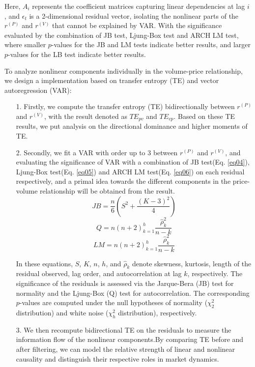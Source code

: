 \documentclass{elsarticle}
\def\sum{}%
\def\rightarrow{}%
\begin{document}
  Here, $A_i$ represents the coefficient matrices capturing linear dependencies at lag $i$ , and $\epsilon_t$ is a 2-dimensional residual vector, isolating the nonlinear parts of the $r^{(P)}$ and $r^{(V)}$ that cannot be explained by VAR. With the significance evaluated by the combination of JB test, Ljung-Box test and ARCH LM test, where smaller $p$-values for the JB and LM tests indicate better results, and larger $p$-values for the LB test indicate better results.
  
  To analyze nonlinear components individually in the volume-price relationship, we design a implementation based on transfer entropy (TE) and vector autoregression (VAR):
\begin{itemize}
  \item[1.] Firstly, we compute the transfer entropy (TE) bidirectionally between $r^{(P)}$ and $r^{(V)}$, with the result denoted as $TE_{p\rightarrow v}$ and $TE_{v\rightarrow p}$. Based on these TE results, we put analysis on the directional dominance and higher moments of TE.
  \item[2.] Secondly, we fit a VAR with order up to 3 between $r^{(P)}$ and $r^{(V)}$, and evaluating the significance of VAR with a combination of JB test(Eq. \ref{eq04}), Ljung-Box test(Eq. \ref{eq05}) and ARCH LM test(Eq. \ref{eq06}) on each residual respectively, and a primal idea towards the different components in the price-volume relationship will be obtained from the result.
  \begin{equation} \label{eq04}
    JB = \frac{n}{6} \left( S^2 + \frac{(K - 3)^2}{4} \right)
  \end{equation}
  \begin{equation} \label{eq05}
    Q = n(n+2) \sum_{k=1}^{h} \frac{\hat{\rho}_k^2}{n - k}
  \end{equation}
  \begin{equation} \label{eq06}
    LM = n(n+2) \sum_{k=1}^{h} \frac{\hat{\rho}_k^2}{n - k}
  \end{equation}

  In these equations, $S$, $K$, $n$, $h$, and \(\hat{\rho}_k\) denote skewness, kurtosis, length of the residual observed, lag order, and autocorrelation at lag $k$, respectively. The significance of the residuals is assessed via the Jarque-Bera (JB) test for normality and the Ljung-Box (Q) test for autocorrelation. The corresponding $p$-values are computed under the null hypotheses of normality ($\chi^2_2$ distribution) and white noise ($\chi^2_h$ distribution), respectively.
  \item[3.] We then recompute bidirectional TE on the residuals to measure the information flow of the nonlinear components.By comparing TE before and after filtering, we can model the relative strength of linear and nonlinear causality and distinguish their respective roles in market dynamics. 

\end{itemize}
\end{document}

